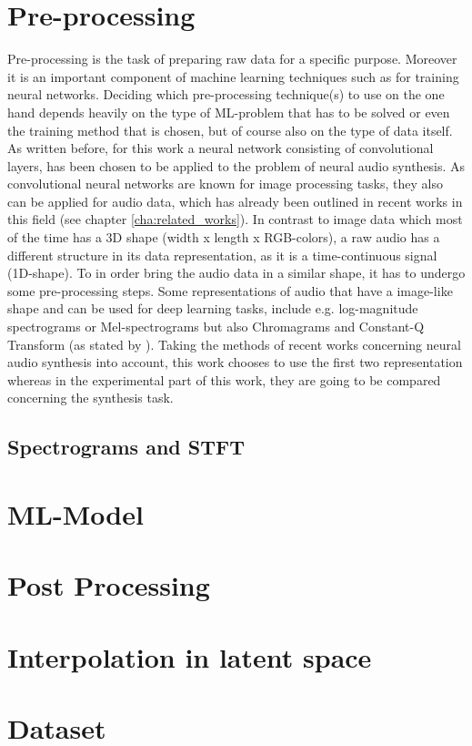 \section{Pre-processing}
\label{sec:app_pre-processing}
Pre-processing is the task of preparing raw data for a specific purpose. Moreover it is an important component of machine learning techniques such as for training neural networks. Deciding which pre-processing technique(s) to use on the one hand depends heavily on the type of ML-problem that has to be solved or even the training method that is chosen, but of course also on the type of data itself. As written before, for this work a neural network consisting of convolutional layers, has been chosen to be applied to the problem of neural audio synthesis. As convolutional neural networks are known for image processing tasks, they also can be applied for audio data, which has already been outlined in recent works in this field (see chapter \ref{cha:related_works}). In contrast to image data which most of the time has a 3D shape (width x length x RGB-colors), a raw audio has a different structure in its data representation, as it is a time-continuous signal (1D-shape). To in order bring the audio data in a similar shape, it has to undergo some pre-processing steps. Some representations of audio that have a image-like shape and can be used for deep learning tasks, include e.g. log-magnitude spectrograms or Mel-spectrograms but also Chromagrams and Constant-Q Transform (as stated by \cite{choi2018tutorial}). Taking the methods of recent works concerning neural audio synthesis into account, this work chooses to use the first two representation whereas in the experimental part of this work, they are going to be compared concerning the synthesis task.

\subsection{Spectrograms and STFT}



\section{ML-Model}
\label{sec:app_model}

\section{Post Processing}
\label{sec:app_sec_post_processing}

\section{Interpolation in latent space}
\label{sec:app_interpolation}

\section{Dataset}
\label{sec:app_dataset}
